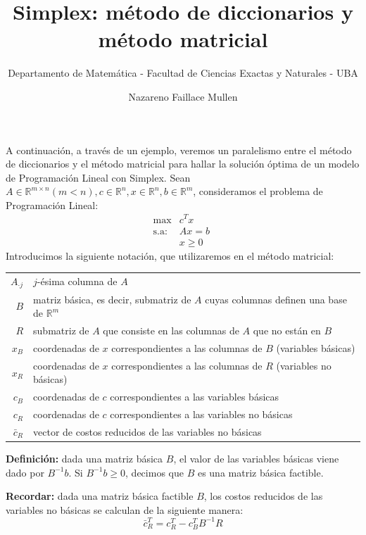 \documentclass{article}
\title{Simplex: método de diccionarios y método matricial}
\author{Departamento de Matemática - Facultad de Ciencias Exactas y Naturales - UBA}
\date{Nazareno Faillace Mullen}
\newcommand{\binv}{B^{-1}}
\begin{document}
    \maketitle
    \thispagestyle{empty}

    A continuación, a través de un ejemplo, veremos un paralelismo entre el método de diccionarios y el método
    matricial para hallar la solución óptima de un modelo de Programación Lineal con Simplex.
    Sean $A\in\mathbb{R}^{m\times n} (m<n), c\in\mathbb{R}^n, x\in\mathbb{R}^n, b\in\mathbb{R}^m$, consideramos el
    problema de
    Programación Lineal:
    \[\begin{array}{cl}
        \max & c^Tx  \\
        \text{s.a:} & Ax = b \\
         & x \geq 0 \quad
    \end{array}
    \]
    Introducimos la siguiente notación, que utilizaremos en el método matricial:
    \begin{table}[h!]
        \centering
        \begin{tabular}{rl}
        $A_{\boldsymbol{\cdot} j}$ & $j$-ésima columna de $A$ \\
        $B$ & matriz básica, es decir, submatriz de $A$ cuyas columnas definen una base de $\mathbb{R}^m$ \\
        $R$ & submatriz de $A$ que consiste en las columnas de $A$ que no están en $B$ \\
        $x_B$ & coordenadas de $x$ correspondientes a las columnas de $B$ (variables básicas) \\
        $x_R$ & coordenadas de $x$ correspondientes a las columnas de $R$ (variables no básicas) \\
        $c_B$ & coordenadas de $c$ correspondientes a las variables básicas \\
        $c_R$ & coordenadas de $c$ correspondientes a las variables no básicas \\
        $\bar{c}_R$ & vector de costos reducidos de las variables no básicas
        \end{tabular}
    \end{table}

    \textbf{Definición:} dada una matriz básica $B$, el valor de las variables básicas viene dado por $\binv b$. Si
    $\binv b\geq 0$, decimos que $B$ es una matriz básica factible.

    \textbf{Recordar:} dada una matriz básica factible $B$, los costos reducidos de las variables no básicas se
    calculan de la siguiente manera:
    \[\bar{c}_R^T = c_R^T - c_B^T\binv R\]
\end{document}

